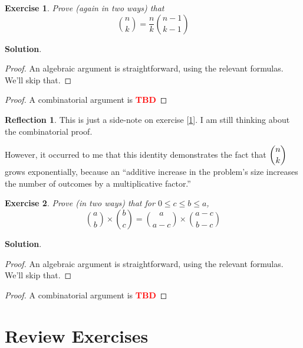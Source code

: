 \documentclass[11pt]{book}
\theoremstyle{definition}
\theoremstyle{plain}
\newtheorem{exercise}{Exercise}
\theoremstyle{definition}
\theoremstyle{problemstyle}
\theoremstyle{remark}
\theoremstyle{definition}
\newtheorem{reflection}{Reflection}
\newcommand{\tbd}{
    \vspace{5mm}
    \textbf{\textcolor{red}{\Large{TBD}}}
    \vspace{5mm}
}
\begin{document}
\begin{exercise}
    \label{ex:1.8.6}
    Prove (again in two ways) that
    \begin{equation}
        \label{eq:nckn-1ck-1}
        \binom{n}{k}=\frac{n}{k}\binom{n-1}{k-1}
    \end{equation}
\end{exercise}
\textbf{Solution}.
\begin{proof}
    An algebraic argument is straightforward, using the relevant formulas. We'll skip that.
\end{proof}
\begin{proof}

    A combinatorial argument is \tbd
\end{proof}
\begin{reflection}
    This is just a side-note on exercise [\ref{ex:1.8.6}]. I am still thinking about the combinatorial proof.
    
    However, it occurred to me that this identity demonstrates the fact that $\dbinom{n}{k}$ grows exponentially, because an ``additive increase in the problem's size increases the number of outcomes by a multiplicative factor.''

\end{reflection}
\begin{exercise}
    \label{ex:1.8.7}
    Prove (in two ways) that for $0\leq c\leq b\leq a$,
    \begin{equation}
        \label{eq:abc-identity}
        \binom{a}{b}\times\binom{b}{c}=\binom{a}{a-c}\times\binom{a-c}{b-c}
    \end{equation}
\end{exercise}
\textbf{Solution}.
\begin{proof}
    An algebraic argument is straightforward, using the relevant formulas. We'll skip that.
\end{proof}
\begin{proof}
    A combinatorial argument is \tbd
\end{proof}

\section*{Review Exercises}
\end{document}

